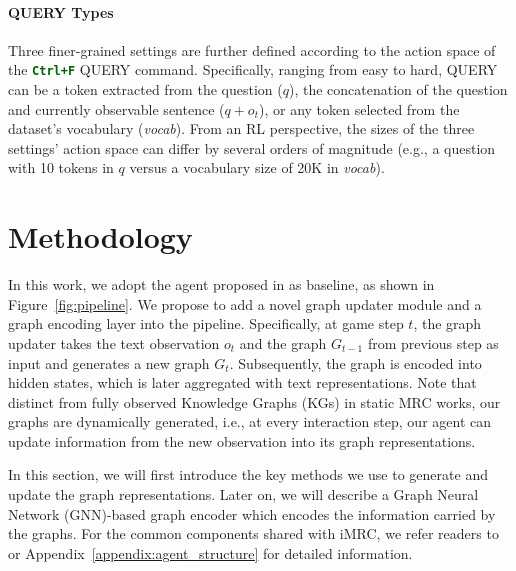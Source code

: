 \documentclass[11pt]{article}
\newcommand{\code}[1]{\texttt{#1}}
\newcommand{\cmd}[1]{\textcolor{darkgreen}{\textbf{\small{\code{#1}}}}}
\newcommand{\imrc}{iMRC\xspace}
\newcommand{\ctrlf}{Ctrl+F\xspace}
\newcommand{\query}{\textcolor{orange2}{\small{QUERY}}\xspace}
\begin{document}
\paragraph{\query Types}
Three finer-grained settings are further defined according to the action space of the \cmd{\ctrlf} \query command.
Specifically, ranging from easy to hard, \query can be a token extracted from the question ($q$), the concatenation of the question and currently observable sentence ($q + o_t$), or any token selected from the dataset's vocabulary (\textit{vocab}).
From an RL perspective, the sizes of the three settings' action space can differ by several orders of magnitude (e.g., a question with 10 tokens in $q$ versus a vocabulary size of 20K in \textit{vocab}).


\section{Methodology}
\label{section:method}


In this work, we adopt the agent proposed in \citep{yuan2020imrc} as baseline, as shown in Figure~\ref{fig:pipeline}.
We propose to add a novel graph updater module and a graph encoding layer into the pipeline.
Specifically, at game step $t$, the graph updater takes the text observation $o_t$ and the graph $G_{t-1}$ from previous step as input and generates a new graph $G_t$.
Subsequently, the graph is encoded into hidden states, which is later aggregated with text representations. 
Note that distinct from fully observed Knowledge Graphs (KGs) in static MRC works, our graphs are dynamically generated, i.e., at every interaction step, our agent can update information from the new observation into its graph representations.


In this section, we will first introduce the key methods we use to generate and update the graph representations.
Later on, we will describe a Graph Neural Network (GNN)-based graph encoder which encodes the information carried by the graphs.
For the common components shared with \imrc, we refer readers to \citep{yuan2020imrc} or Appendix~\ref{appendix:agent_structure} for detailed information.
\end{document}
